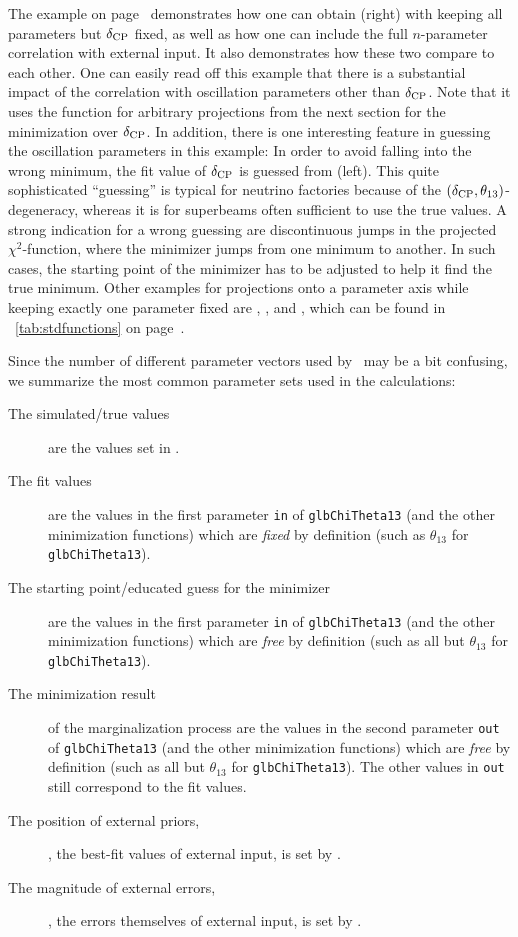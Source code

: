 The example on page~\pageref{ex:corrproj} demonstrates how one can obtain  (right) with keeping all parameters but $\delta_{\mathrm{CP}}$ fixed, as well as how one can include the full $n$-parameter correlation with external input. It also demonstrates how these two compare to each other. One can easily read off this example that 
there is a substantial impact of the
correlation with oscillation parameters other than $\delta_{\mathrm{CP}}$. 
Note that it uses the function
 for arbitrary projections from the next section for the minimization over $\delta_{\mathrm{CP}}$.
In addition, there is one interesting feature in guessing the
oscillation parameters in this example: In order to avoid falling
into the wrong minimum, the fit value of $\delta_{\mathrm{CP}}$ is guessed from  (left). This quite sophisticated ``guessing'' is typical
for neutrino factories because of the $(\delta_{\mathrm{CP}}, \theta_{13})$-degeneracy, whereas it is for superbeams often sufficient
to use the true values. A strong indication for a wrong guessing 
are discontinuous jumps in the projected $\chi^2$-function, where the minimizer jumps from one minimum to another. In such cases, the starting point of the minimizer has to be adjusted to help it find the true minimum.
%
Other examples for projections onto a parameter axis while keeping exactly one parameter fixed are , , and , which
can be found in \Tab~\ref{tab:stdfunctions} on page~\pageref{tab:stdfunctions}.

Since the number of different parameter vectors used by \GLOBES\ may be a bit confusing, we summarize the most common parameter sets used in the calculations:
\begin{description}
\item[The simulated/true values] are the values set in .
\item[The fit values] are the values in the first parameter {\tt in} of {\tt glbChiTheta13} (and the other minimization functions) which are {\em fixed} by definition (such as $\theta_{13}$ for {\tt glbChiTheta13}). 
\item[The starting point/educated guess for the minimizer] are the values in the first parameter {\tt in} of {\tt glbChiTheta13} (and the other minimization functions) which are {\em free} by definition (such as all but $\theta_{13}$ for {\tt glbChiTheta13}). 
\item[The minimization result] of the marginalization process are the values in the second parameter {\tt out} of {\tt glbChiTheta13} (and the other minimization functions) which are {\em free} by definition (such as all but $\theta_{13}$ for {\tt glbChiTheta13}). The other values in {\tt out} still correspond to the fit values. 
\item[The position of external priors,] \ie, the best-fit values of external input, is set by .
\item[The magnitude of external errors,] \ie, the errors themselves of external input, is set by .
\end{description}


